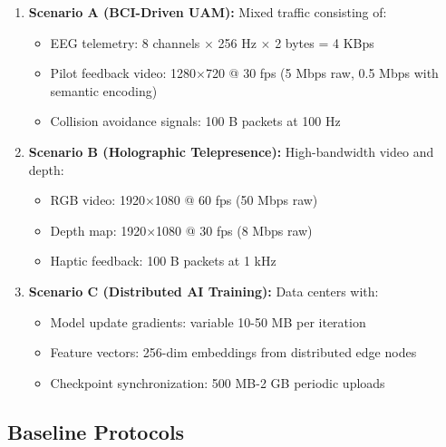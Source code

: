 \documentclass[journal]{IEEEtran}
\begin{document}
\begin{enumerate}
    \item \textbf{Scenario A (BCI-Driven UAM):} Mixed traffic consisting of:
    \begin{itemize}
        \item EEG telemetry: 8 channels $\times$ 256 Hz $\times$ 2 bytes = 4 KBps
        \item Pilot feedback video: 1280$\times$720 @ 30 fps (5 Mbps raw, 0.5 Mbps with semantic encoding)
        \item Collision avoidance signals: 100 B packets at 100 Hz
    \end{itemize}
    \item \textbf{Scenario B (Holographic Telepresence):} High-bandwidth video and depth:
    \begin{itemize}
        \item RGB video: 1920$\times$1080 @ 60 fps (50 Mbps raw)
        \item Depth map: 1920$\times$1080 @ 30 fps (8 Mbps raw)
        \item Haptic feedback: 100 B packets at 1 kHz  
    \end{itemize}
    \item \textbf{Scenario C (Distributed AI Training):} Data centers with:
    \begin{itemize}
        \item Model update gradients: variable 10-50 MB per iteration
        \item Feature vectors: 256-dim embeddings from distributed edge nodes
        \item Checkpoint synchronization: 500 MB-2 GB periodic uploads
    \end{itemize}
\end{enumerate}

\subsection{Baseline Protocols}
\end{document}
